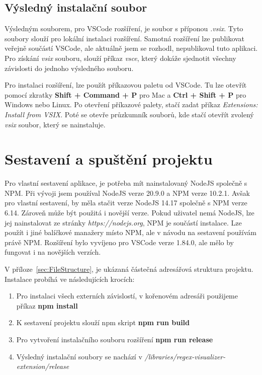 \subsection*{Výsledný instalační soubor}

Výsledným souborem, pro VSCode rozšíření, je soubor s příponou \textit{.vsix}.
Tyto soubory slouží pro lokální instalaci rozšíření. 
Samotná rozšíření lze publikovat veřejně součástí VSCode, ale aktuálně jsem se rozhodl, nepublikoval tuto aplikaci.
Pro získání \textit{vsix} souboru, slouží příkaz \textit{vsce}, který dokáže sjednotit všechny závislosti do jednoho výsledného souboru.

Pro instalaci rozšíření, lze použít příkazovou paletu od VSCode.
Tu lze otevřít pomocí zkratky \textbf{Shift + Command + P} pro Mac a \textbf{Ctrl + Shift + P} pro Windows nebo Linux.
Po otevření příkazové palety, stačí zadat příkaz \textit{Extensions: Install from VSIX}.
Poté se otevře průzkumník souborů, kde stačí otevřít zvolený \textit{vsix} soubor, který se nainstaluje.


\section{Sestavení a spuštění projektu}

Pro vlastní sestavení aplikace, je potřeba mít nainstalovaný NodeJS společně s NPM.
Při vývoji jsem používal NodeJS verze 20.9.0 a NPM verze 10.2.1.
Avšak pro vlastní sestavení, by měla stačit verze NodeJS 14.17 společně s NPM verze 6.14.
Zároveň může být použitá i novější verze. 
Pokud uživatel nemá NodeJS, lze jej nainstalovat ze stránky \textit{https://nodejs.org}, NPM je součástí instalace.
Lze použít i jiné balíčkové manažery místo NPM, ale v návodu na sestavení používám právě NPM.
Rozšíření bylo vyvíjeno pro VSCode verze 1.84.0, ale mělo by fungovat i na novějších verzích.

V příloze~\ref{sec:FileStructure}, je ukázaná částečná adresářová struktura projektu.
Instalace probíhá ve následujících krocích:

\begin{enumerate}
	\item Pro instalaci všech externích závislostí, v kořenovém adresáři použijeme příkaz \textbf{\textcolor{OliveGreen}{npm install}}
	\item K sestavení projektu slouží npm skript \textbf{\textcolor{OliveGreen}{npm run build}}
	\item Pro vytvoření instalačního souboru rozšíření \textbf{\textcolor{OliveGreen}{npm run release}}
	\item Výsledný instalační soubory se nachází v \textit{/libraries/regex-visualizer-extension/release}
\end{enumerate}


\endinput